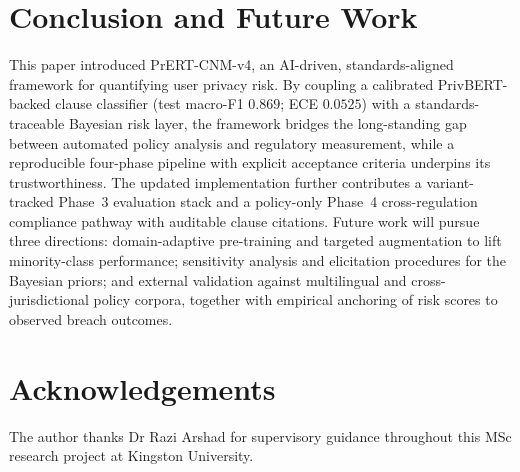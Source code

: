 \documentclass[conference]{IEEEtran}
\begin{document}
\section{Conclusion and Future Work}\label{sec:conclusion}
This paper introduced PrERT-CNM-v4, an AI-driven, standards-aligned framework
for quantifying user privacy risk. By coupling a calibrated PrivBERT-backed
clause classifier (test macro-F1 $0.869$; ECE $0.0525$) with a
standards-traceable Bayesian risk layer, the framework bridges the long-standing gap between
automated policy analysis and regulatory measurement, while a reproducible
four-phase pipeline with explicit acceptance criteria underpins its
trustworthiness. The updated implementation further contributes a
variant-tracked Phase~3 evaluation stack and a policy-only Phase~4
cross-regulation compliance pathway with auditable clause citations.
Future work will pursue three directions: domain-adaptive
pre-training and targeted augmentation to lift minority-class performance;
sensitivity analysis and elicitation procedures for the Bayesian priors; and
external validation against multilingual and cross-jurisdictional policy
corpora, together with empirical anchoring of risk scores to observed breach
outcomes.

\section*{Acknowledgements}
The author thanks Dr Razi Arshad for supervisory guidance throughout this MSc
research project at Kingston University.



\end{document}
